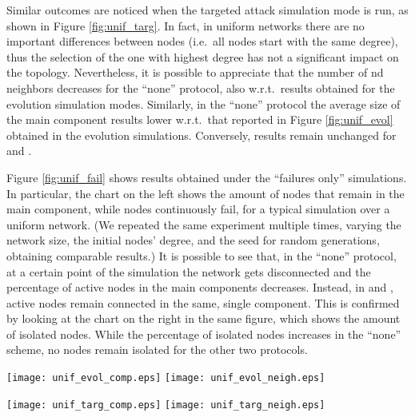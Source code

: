 \documentclass[10pt, conference, compsocconf]{IEEEtran}
\begin{document}
Similar outcomes are noticed when the targeted attack simulation mode is run, as shown in Figure \ref{fig:unif_targ}.
In fact, in uniform networks there are no important differences between nodes (i.e.~all nodes start with the same degree), thus the selection of the one with highest degree has not a significant impact on the topology. Nevertheless, it is possible to appreciate that the number of nd neighbors decreases for the ``none'' protocol, also w.r.t.~results obtained for the evolution simulation modes. Similarly, in the ``none'' protocol the average size of the main component results lower w.r.t.~that reported in Figure \ref{fig:unif_evol} obtained in the evolution simulations. Conversely, results remain unchanged for  and .

Figure \ref{fig:unif_fail} shows results obtained under the ``failures only'' simulations. In particular, the chart on the left shows the amount of nodes that remain in the main component, while nodes continuously fail, for a typical simulation over a uniform network. (We repeated the same experiment multiple times, varying the network size, the initial nodes' degree, and the seed for random generations, obtaining comparable results.)
It is possible to see that, in the ``none'' protocol, at a certain point of the simulation the network gets disconnected and the percentage of active nodes in the main components decreases. Instead, in  and , active nodes remain connected in the same, single component. 
This is confirmed by looking at the chart on the right in the same figure, which shows the amount of isolated nodes. While the percentage of isolated nodes increases in the ``none'' scheme, no nodes remain isolated for the other two protocols.

\begin{figure*}[t]
   \centering
   \texttt{[image: unif\_evol\_comp.eps]}
   \texttt{[image: unif\_evol\_neigh.eps]}
   \caption{Uniform networks: average size of the main components, average amount of st neighbors (referred as ``n1'') and nd neighbors (referred as ``n2''), during the evolution of the network.}
   \label{fig:unif_evol}
\end{figure*}

\begin{figure*}[t]
   \centering
   \texttt{[image: unif\_targ\_comp.eps]}
   \texttt{[image: unif\_targ\_neigh.eps]}
   \caption{Uniform networks: average size of the main components, average amount of st neighbors (referred as ``n1'') and nd neighbors (referred as ``n2''), under a targeted attack.}
   \label{fig:unif_targ}
\end{figure*}
\end{document}

